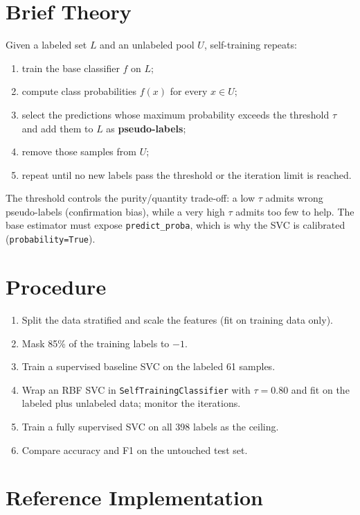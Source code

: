 \section{Brief Theory}
Given a labeled set $L$ and an unlabeled pool $U$, self-training repeats:
\begin{enumerate}
  \item train the base classifier $f$ on $L$;
  \item compute class probabilities $f(x)$ for every $x \in U$;
  \item select the predictions whose maximum probability exceeds the threshold $\tau$ and add
        them to $L$ as \textbf{pseudo-labels};
  \item remove those samples from $U$;
  \item repeat until no new labels pass the threshold or the iteration limit is reached.
\end{enumerate}
The threshold controls the purity/quantity trade-off: a low $\tau$ admits wrong pseudo-labels
(confirmation bias), while a very high $\tau$ admits too few to help. The base estimator must
expose \texttt{predict\_proba}, which is why the SVC is calibrated
(\texttt{probability=True}).

\section{Procedure}
\begin{enumerate}
  \item Split the data stratified and scale the features (fit on training data only).
  \item Mask 85\% of the training labels to $-1$.
  \item Train a supervised baseline SVC on the labeled 61 samples.
  \item Wrap an RBF SVC in \texttt{SelfTrainingClassifier} with $\tau = 0.80$ and fit on the
        labeled plus unlabeled data; monitor the iterations.
  \item Train a fully supervised SVC on all 398 labels as the ceiling.
  \item Compare accuracy and F1 on the untouched test set.
\end{enumerate}

\section{Reference Implementation}


